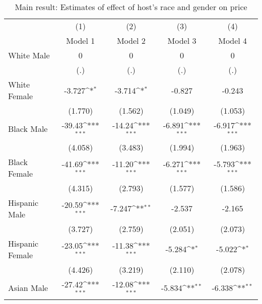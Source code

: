 {
\def\sym#1{\ifmmode^{#1}\else\(^{#1}\)\fi}
\begin{longtable}{l*{4}{c}}
\caption{Main result: Estimates of effect of host's race and gender on price}\\
\hline\hline\endfirsthead\hline\endhead\hline\endfoot\endlastfoot
                    &\multicolumn{1}{c}{(1)}&\multicolumn{1}{c}{(2)}&\multicolumn{1}{c}{(3)}&\multicolumn{1}{c}{(4)}\\
                    &\multicolumn{1}{c}{Model 1}&\multicolumn{1}{c}{Model 2}&\multicolumn{1}{c}{Model 3}&\multicolumn{1}{c}{Model 4}\\
\hline
White Male          &           0         &           0         &           0         &           0         \\
                    &         (.)         &         (.)         &         (.)         &         (.)         \\
[1em]
White Female        &      -3.727\sym{*}  &      -3.714\sym{*}  &      -0.827         &      -0.243         \\
                    &     (1.770)         &     (1.562)         &     (1.049)         &     (1.053)         \\
[1em]
Black Male          &      -39.43\sym{***}&      -14.24\sym{***}&      -6.891\sym{***}&      -6.917\sym{***}\\
                    &     (4.058)         &     (3.483)         &     (1.994)         &     (1.963)         \\
[1em]
Black Female        &      -41.69\sym{***}&      -11.20\sym{***}&      -6.271\sym{***}&      -5.793\sym{***}\\
                    &     (4.315)         &     (2.793)         &     (1.577)         &     (1.586)         \\
[1em]
Hispanic Male       &      -20.59\sym{***}&      -7.247\sym{**} &      -2.537         &      -2.165         \\
                    &     (3.727)         &     (2.759)         &     (2.051)         &     (2.073)         \\
[1em]
Hispanic Female     &      -23.05\sym{***}&      -11.38\sym{***}&      -5.284\sym{*}  &      -5.022\sym{*}  \\
                    &     (4.426)         &     (3.219)         &     (2.110)         &     (2.078)         \\
[1em]
Asian Male          &      -27.42\sym{***}&      -12.08\sym{***}&      -5.834\sym{**} &      -6.338\sym{**} \\

\end{longtable}}
